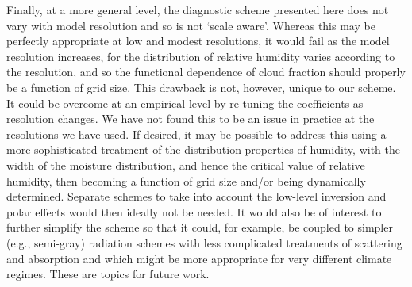 Finally, at a more general level, the diagnostic scheme presented here does not vary with model resolution and so is not `scale aware'. Whereas this may be perfectly appropriate at low and modest resolutions, it would fail as the model resolution increases, for the distribution of relative humidity varies according to the resolution, and so the functional dependence of cloud fraction should properly be a function of grid size. This drawback is not, however, unique to our scheme. It could be overcome at an empirical level by re-tuning the coefficients as resolution changes. We have not found this to be an issue in practice at the resolutions we have used. If desired, it may be possible to address this using a more sophisticated treatment of the distribution properties of humidity, with the width of the moisture distribution, and hence the critical value of relative humidity, then becoming a function of grid size and/or being dynamically determined. Separate schemes to take into account the low-level inversion and polar effects would then ideally not be needed. It would also be of interest to further simplify the scheme so that it could, for example, be coupled to simpler (e.g., semi-gray) radiation schemes with less complicated treatments of scattering and absorption and which might be more appropriate for very different climate regimes. These are topics for future work. 

